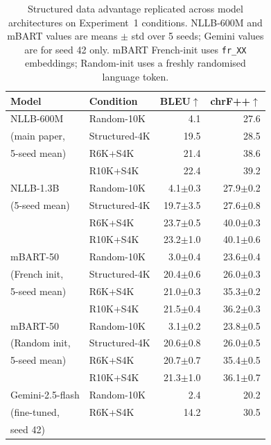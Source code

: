 \documentclass[11pt]{article}
\begin{document}
\begin{table}[h]
\centering
\small
\begin{tabular}{llrr}
\toprule
\textbf{Model} & \textbf{Condition} & \textbf{BLEU}$\uparrow$ & \textbf{chrF++}$\uparrow$ \\
\midrule
NLLB-600M        & Random-10K       & 4.1  & 27.6 \\
(main paper,     & Structured-4K    & 19.5 & 28.5 \\
5-seed mean)     & R6K+S4K          & 21.4 & 38.6 \\
                 & R10K+S4K         & 22.4 & 39.2 \\
\midrule
NLLB-1.3B        & Random-10K       & 4.1$\pm$0.3  & 27.9$\pm$0.2 \\
(5-seed mean)    & Structured-4K    & 19.7$\pm$3.5 & 27.6$\pm$0.8 \\
                 & R6K+S4K          & 23.7$\pm$0.5 & 40.0$\pm$0.3 \\
                 & R10K+S4K         & 23.2$\pm$1.0 & 40.1$\pm$0.6 \\
\midrule
mBART-50         & Random-10K       & 3.0$\pm$0.4 & 23.6$\pm$0.4 \\
(French init,    & Structured-4K    & 20.4$\pm$0.6 & 26.0$\pm$0.3 \\
5-seed mean)     & R6K+S4K          & 21.0$\pm$0.3 & 35.3$\pm$0.2 \\
                 & R10K+S4K         & 21.5$\pm$0.4 & 36.2$\pm$0.3 \\
\midrule
mBART-50         & Random-10K       & 3.1$\pm$0.2 & 23.8$\pm$0.5 \\
(Random init,    & Structured-4K    & 20.6$\pm$0.8 & 26.0$\pm$0.5 \\
5-seed mean)     & R6K+S4K          & 20.7$\pm$0.7 & 35.4$\pm$0.5 \\
                 & R10K+S4K         & 21.3$\pm$1.0 & 36.1$\pm$0.7 \\
\midrule
Gemini-2.5-flash & Random-10K       & 2.4  & 20.2 \\
(fine-tuned,     & R6K+S4K          & 14.2 & 30.5 \\
seed 42)         &                  &      &      \\
\bottomrule
\end{tabular}
\caption{Structured data advantage replicated across model architectures on Experiment~1
conditions. NLLB-600M and mBART values are means $\pm$ std over 5 seeds; Gemini values
are for seed 42 only. mBART French-init uses \texttt{fr\_XX} embeddings; Random-init
uses a freshly randomised language token.}
\label{tab:robustness}
\end{table}
\end{document}
